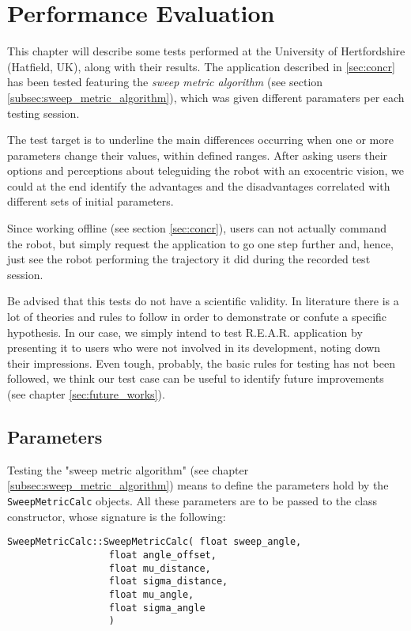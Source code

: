 \section{Performance Evaluation}
\label{sec:performance_evaluation}
%
This chapter will describe some tests performed at the University of Hertfordshire
(Hatfield, UK), along with their results. 
%
The application described in \ref{sec:concr} has been tested 
featuring the \textit{sweep metric algorithm} (see section 
\ref{subsec:sweep_metric_algorithm}), which was 
given different paramaters per each testing session.
%

%
The test target is to underline the main differences 
occurring when one or more parameters change their values, 
within defined ranges. After asking users their options and perceptions
about teleguiding the robot with an exocentric vision, we could at the end identify the advantages
and the disadvantages correlated with different sets of initial parameters.
%

%
Since working offline (see section \ref{sec:concr}), users can not actually 
command the robot, but simply request the application to go one step
further and, hence, just see the robot performing the trajectory 
it did during the recorded test session.
%

%
Be advised that this tests do not have a scientific validity. In literature there is a lot of theories
and rules to follow in order to demonstrate or confute a specific hypothesis. In our case, we simply
intend to test R.E.A.R. application by presenting it to users who were not involved in its development,
noting down their impressions. Even tough, probably, the basic rules for testing has not been followed,
we think our test case can be useful to identify future improvements (see chapter \ref{sec:future_works}).

\subsection{Parameters}
\label{subsec:parameters}

Testing the "sweep metric algorithm" (see chapter \ref{subsec:sweep_metric_algorithm}) means to define
the parameters hold by the \texttt{SweepMetricCalc} objects. All these parameters are 
to be passed to the class constructor, whose signature is the following:
\\
%
\begin{verbatim}
SweepMetricCalc::SweepMetricCalc( float sweep_angle,
				  float angle_offset,
				  float mu_distance,
				  float sigma_distance,
				  float mu_angle,
				  float sigma_angle
				  )
\end{verbatim}
%

